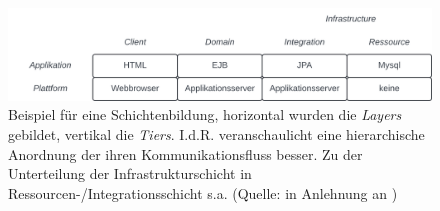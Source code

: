 \begin{figure}
    \centering
    \includegraphics[scale=0.4]{part two/Objektorientierte Analyse/img/layerstiers}
    \caption{Beispiel für eine Schichtenbildung, horizontal wurden die \textit{Layers} gebildet, vertikal die \textit{Tiers}. I.d.R. veranschaulicht eine hierarchische Anordnung der  ihren Kommunikationsfluss besser. Zu der Unterteilung der Infrastrukturschicht in Ressourcen-/Integrationsschicht s.a. \cite[144]{Sta14g} (Quelle: in Anlehnung an \cite[42]{Wed09b})}
    \label{fig:layerstiers}
\end{figure}
